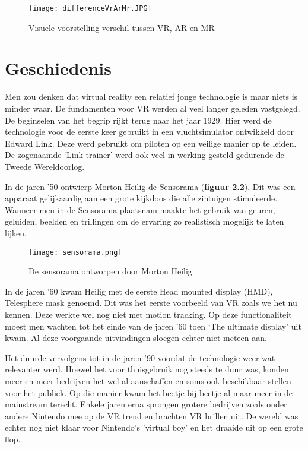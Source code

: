 \begin{figure}[h]
    \centering
    \texttt{[image: differenceVrArMr.JPG]}
    \caption{Visuele voorstelling verschil tussen VR, AR en MR \autocite{Barel2017}}
\end{figure}

\section{Geschiedenis}

Men zou denken dat virtual reality een relatief jonge technologie is maar niets is minder waar. De fundamenten voor VR werden al veel langer geleden vastgelegd. De beginselen van het begrip rijkt terug naar het jaar 1929. Hier werd de technologie voor de eerste keer gebruikt in een vluchtsimulator ontwikkeld door Edward Link. Deze werd gebruikt om piloten op een veilige manier op te leiden. De zogenaamde ‘Link trainer’ werd ook veel in werking gesteld gedurende de Tweede Wereldoorlog.


In de jaren ’50 ontwierp Morton Heilig de Sensorama (\textbf{figuur 2.2}). Dit was een apparaat gelijkaardig aan een grote kijkdoos die alle zintuigen stimuleerde. Wanneer men in de Sensorama plaatsnam maakte het gebruik van geuren, geluiden, beelden en trillingen om de ervaring zo realistisch mogelijk te laten lijken. 

\begin{figure}[h]
    \centering
    \texttt{[image: sensorama.png]}
    \caption{De sensorama ontworpen door Morton Heilig \autocite{Society2019}}
\end{figure}

In de jaren ’60 kwam Heilig met de eerste Head mounted display (HMD), Telesphere mask genoemd. Dit was het eerste voorbeeld van VR zoals we het nu kennen. Deze werkte wel nog niet met motion tracking.
Op deze functionaliteit moest men wachten tot het einde van de jaren ’60 toen ‘The ultimate display’ uit kwam.
Al deze voorgaande uitvindingen sloegen echter niet meteen aan.

Het duurde vervolgens tot in de jaren ’90 voordat de technologie weer wat relevanter werd. Hoewel het voor thuisgebruik nog steeds te duur was, konden meer en meer bedrijven het wel al aanschaffen en soms ook beschikbaar stellen voor het publiek. Op die manier kwam het beetje bij beetje al maar meer in de mainstream terecht. Enkele jaren erna sprongen grotere bedrijven zoals onder andere Nintendo mee op de VR trend en brachten VR brillen uit. De wereld was echter nog niet klaar voor Nintendo's 'virtual boy' en het draaide uit op een grote flop. 

